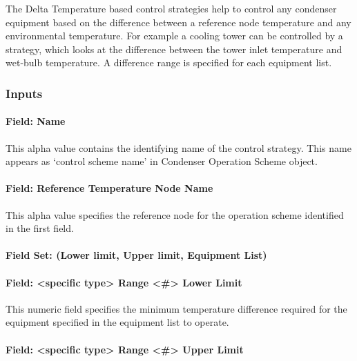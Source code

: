 The Delta Temperature based control strategies help to control any condenser equipment based on the difference between a reference node temperature and any environmental temperature. For example a cooling tower can be controlled by a strategy, which looks at the difference between the tower inlet temperature and wet-bulb temperature. A difference range is specified for each equipment list.

\subsubsection{Inputs}\label{inputs-11-011}

\paragraph{Field: Name}\label{field-name-5-016}

This alpha value contains the identifying name of the control strategy. This name appears as `control scheme name' in Condenser Operation Scheme object.

\paragraph{Field: Reference Temperature Node Name}\label{field-reference-temperature-node-name}

This alpha value specifies the reference node for the operation scheme identified in the first field.

\paragraph{Field Set: (Lower limit, Upper limit, Equipment List)}\label{field-set-lower-limit-upper-limit-equipment-list}

\paragraph{Field: \textless{}specific type\textgreater{} Range \textless{}\#\textgreater{} Lower Limit}\label{field-specific-type-range-lower-limit-1}

This numeric field specifies the minimum temperature difference required for the equipment specified in the equipment list to operate.

\paragraph{Field: \textless{}specific type\textgreater{} Range \textless{}\#\textgreater{} Upper Limit}\label{field-specific-type-range-upper-limit-1}

